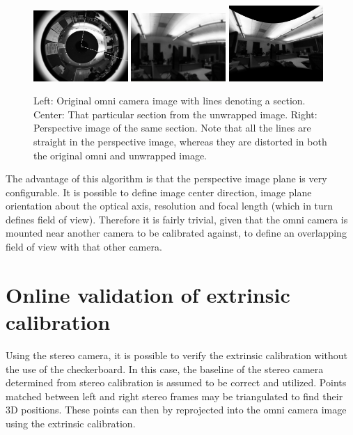 \begin{figure}[b!]
  \centering
    \includegraphics[width=0.32\textwidth]{chapters/images/omni_raw_office}
    \includegraphics[width=0.32\textwidth]{chapters/images/unwrapped_office}
    \includegraphics[width=0.32\textwidth]{chapters/images/perspective_office}
  \caption{Left: Original omni camera image with lines denoting a section.  Center: That particular section from the unwrapped image.  Right: Perspective image of the same section.  Note that all the lines are straight in the perspective image, whereas they are distorted in both the original omni and unwrapped image.}
  \label{fig:omni_images}
\end{figure}

The advantage of this algorithm is that the perspective image plane is very configurable.  It is possible to define image center direction, image plane orientation about the optical axis, resolution and focal length (which in turn defines field of view).  Therefore it is fairly trivial, given that the omni camera is mounted near another camera to be calibrated against, to define an overlapping field of view with that other camera. %


\section{Online validation of extrinsic calibration}
\label{sec:verification_tool}

Using the stereo camera, it is possible to verify the extrinsic calibration without the use of the checkerboard.  In this case, the baseline of the stereo camera determined from stereo calibration is assumed to be correct and utilized.  Points matched between left and right stereo frames may be triangulated to find their 3D positions.  These points can then by reprojected into the omni camera image using the extrinsic calibration.

